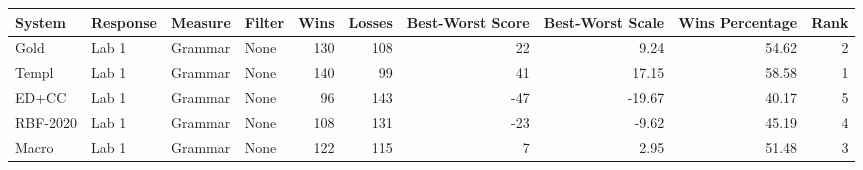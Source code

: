 \begin{tabular}{llllrrrrrr}
\toprule
System & Response & Measure & Filter & Wins & Losses & Best-Worst Score & Best-Worst Scale & Wins Percentage & Rank \\
\midrule
Gold & Lab 1 & Grammar & None & 130 & 108 & 22 & 9.24 & 54.62 & 2 \\
Templ & Lab 1 & Grammar & None & 140 & 99 & 41 & 17.15 & 58.58 & 1 \\
ED+CC & Lab 1 & Grammar & None & 96 & 143 & -47 & -19.67 & 40.17 & 5 \\
RBF-2020 & Lab 1 & Grammar & None & 108 & 131 & -23 & -9.62 & 45.19 & 4 \\
Macro & Lab 1 & Grammar & None & 122 & 115 & 7 & 2.95 & 51.48 & 3 \\
\bottomrule
\end{tabular}
